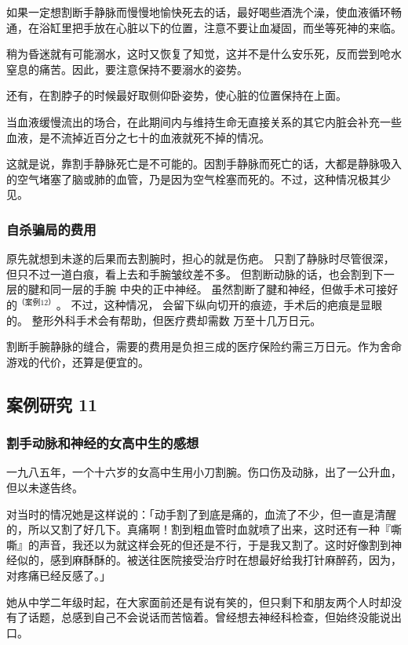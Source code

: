 \documentclass[UTF8]{ctexart}
\begin{document}
如果一定想割断手静脉而慢慢地愉快死去的话，最好喝些酒洗个澡，使血液循环畅通，在浴缸里把手放在心脏以下的位置，注意不要让血凝固，而坐等死神的来临。

稍为昏迷就有可能溺水，这时又恢复了知觉，这并不是什么安乐死，反而尝到呛水窒息的痛苦。因此，要注意保持不要溺水的姿势。

还有，在割脖子的时候最好取侧仰卧姿势，使心脏的位置保持在上面。

当血液缓慢流出的场合，在此期间内与维持生命无直接关系的其它内脏会补充一些血液，是不流掉近百分之七十的血液就死不掉的情况。

这就是说，靠割手静脉死亡是不可能的。因割手静脉而死亡的话，大都是静脉吸入的空气堵塞了脑或肺的血管，乃是因为空气栓塞而死的。不过，这种情况极其少见。

\subsubsection*{自杀骗局的费用}

原先就想到未遂的后果而去割腕时，担心的就是伤疤。
只割了静脉时尽管很深，但只不过一道白痕，看上去和手腕皱纹差不多。
但割断动脉的话，也会割到下一层的腱和同一层的手腕 中央的正中神经。
虽然割断了腱和神经，但做手术可接好的$^{（案例 12）}$。
不过，这种情况， 会留下纵向切开的痕迹，手术后的疤痕是显眼的。
整形外科手术会有帮助，但医疗费却需数 万至十几万日元。

割断手腕静脉的缝合，需要的费用是负担三成的医疗保险约需三万日元。作为舍命游戏的代价，还算是便宜的。

\subsection{案例研究 11}
\subsubsection*{割手动脉和神经的女高中生的感想}

一九八五年，一个十六岁的女高中生用小刀割腕。伤口伤及动脉，出了一公升血，但以未遂告终。

对当时的情况她是这样说的：「动手割了到底是痛的，血流了不少，但一直是清醒的，所以又割了好几下。真痛啊！割到粗血管时血就喷了出来，这时还有一种『嘶嘶』的声音，我还以为就这样会死的但还是不行，于是我又割了。这时好像割到神经似的，感到麻酥酥的。被送往医院接受治疗时在想最好给我打针麻醉药，因为，对疼痛已经反感了。」

她从中学二年级时起，在大家面前还是有说有笑的，但只剩下和朋友两个人时却没有了话题，总感到自己不会说话而苦恼着。曾经想去神经科检查，但始终没能说出口。
\end{document}
